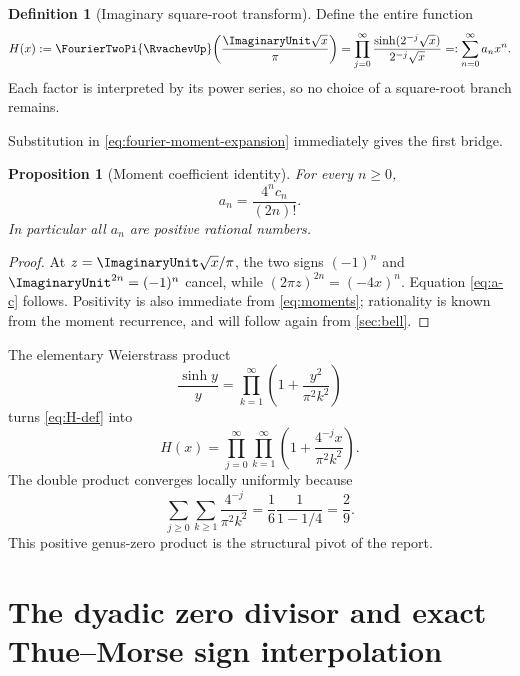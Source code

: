 \documentclass[11pt]{article}
\numberwithin{equation}{section}
\newtheorem{proposition}[theorem]{Proposition}
\theoremstyle{definition}
\newtheorem{definition}[theorem]{Definition}
\theoremstyle{remark}
\begin{document}
\begin{definition}[Imaginary square-root transform]\label{def:H}
Define the entire function
\begin{equation}\label{eq:H-def}
 H(x):=\FourierTwoPi{\RvachevUp}\!\left(\frac{\ImaginaryUnit\sqrt{x}}{\pi}\right)
 =\prod_{j=0}^{\infty}\frac{\sinh(2^{-j}\sqrt{x})}{2^{-j}\sqrt{x}}
 =:\sum_{n=0}^{\infty}a_nx^n.
\end{equation}
Each factor is interpreted by its power series, so no choice of a square-root branch remains.
\end{definition}

Substitution in \eqref{eq:fourier-moment-expansion} immediately gives the first bridge.
\begin{proposition}[Moment coefficient identity]\label{prop:moment-coeff}
For every $n\ge0$,
\begin{equation}\label{eq:a-c}
 a_n=\frac{4^n c_n}{(2n)!}.
\end{equation}
In particular all $a_n$ are positive rational numbers.
\end{proposition}
\begin{proof}
At $z=\ImaginaryUnit\sqrt{x}/\pi$, the two signs $(-1)^n$ and $\ImaginaryUnit^{2n}=(-1)^n$ cancel, while $(2\pi z)^{2n}=(-4x)^n$.  Equation \eqref{eq:a-c} follows.  Positivity is also immediate from \eqref{eq:moments}; rationality is known from the moment recurrence, and will follow again from \cref{sec:bell}.
\end{proof}

The elementary Weierstrass product
\begin{equation}\label{eq:sinh-product}
 \frac{\sinh y}{y}=\prod_{k=1}^{\infty}\left(1+\frac{y^2}{\pi^2k^2}\right)
\end{equation}
turns \eqref{eq:H-def} into
\begin{equation}\label{eq:H-double-product}
 H(x)=\prod_{j=0}^{\infty}\prod_{k=1}^{\infty}
       \left(1+\frac{4^{-j}x}{\pi^2k^2}\right).
\end{equation}
The double product converges locally uniformly because
\[
 \sum_{j\ge0}\sum_{k\ge1}\frac{4^{-j}}{\pi^2k^2}
 =\frac1{6}\frac1{1-1/4}=\frac29.
\]
This positive genus-zero product is the structural pivot of the report.

\section{The dyadic zero divisor and exact Thue--Morse sign interpolation}\label{sec:zeros}
\end{document}

